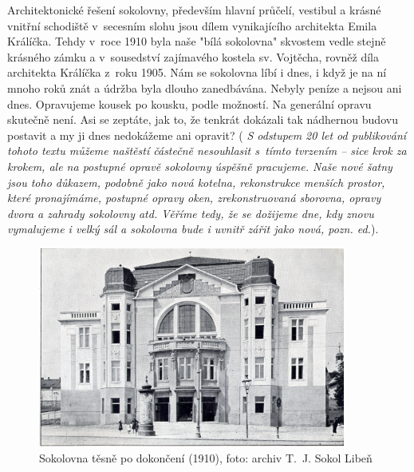 \documentclass[a5paper, 11pt, twoside]{article}
\newcommand{\pozned}[1]{%
\textit{#1}}
\begin{document}
Architektonické řešení sokolovny, především hlavní průčelí, vestibul a
krásné vnitřní schodiště v~secesním slohu jsou dílem vynikajícího
architekta Emila Králíčka. Tehdy v~roce 1910 byla naše "bílá sokolovna"
skvostem vedle stejně krásného zámku a v~sousedství zajímavého kostela
sv. Vojtěcha, rovněž díla architekta Králíčka z~roku 1905. Nám se
sokolovna líbí i dnes, i když je na ní mnoho roků znát a údržba byla
dlouho zanedbávána. Nebyly peníze a nejsou ani dnes. Opravujeme kousek
po kousku, podle možností. Na generální opravu skutečně není. Asi se
zeptáte, jak to, že tenkrát dokázali tak nádhernou budovu postavit a my
ji dnes nedokážeme ani opravit? (\pozned{S odstupem 20 let od publikování
tohoto textu můžeme naštěstí částečně nesouhlasit s~tímto tvrzením --
sice krok za krokem, ale na postupné opravě sokolovny úspěšně pracujeme.
Naše nové šatny jsou toho důkazem, podobně jako nová kotelna,
rekonstrukce menších prostor, které pronajímáme, postupné opravy oken,
zrekonstruovaná sborovna, opravy dvora a zahrady sokolovny atd. Věříme
tedy, že se dožijeme dne, kdy znovu vymalujeme i velký sál a sokolovna
bude i uvnitř zářit jako nová, pozn. ed.}).

\begin{figure}[h!]
  \centering 
  \includegraphics[width=0.9\textwidth]{img/19_sokolovna_dokoncena.jpg}
  \caption*{Sokolovna těsně po dokončení (1910), foto: archiv T.~J. Sokol
  Libeň}
\end{figure}
\end{document}
